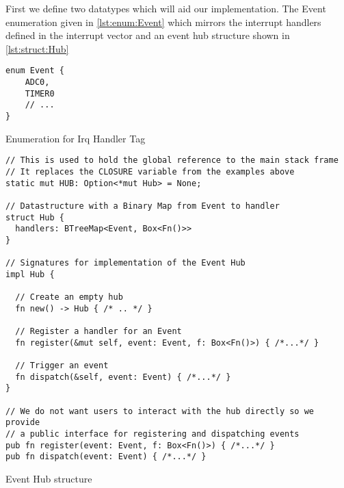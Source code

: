 First we define two datatypes which will aid our implementation.
The Event enumeration given in \autoref{lst:enum:Event} which mirrors the interrupt handlers defined in the interrupt vector and an event hub structure shown in \autoref{lst:struct:Hub}

\begin{listing}[H]
  \begin{verbatim}
enum Event {
    ADC0,
    TIMER0
    // ...
}
  \end{verbatim}
  \caption{Enumeration for Irq Handler Tag}
  \label{lst:enum:Event}
\end{listing}

\begin{listing}[H]
  \begin{verbatim}
// This is used to hold the global reference to the main stack frame
// It replaces the CLOSURE variable from the examples above
static mut HUB: Option<*mut Hub> = None;

// Datastructure with a Binary Map from Event to handler
struct Hub {
  handlers: BTreeMap<Event, Box<Fn()>>
}

// Signatures for implementation of the Event Hub
impl Hub {

  // Create an empty hub
  fn new() -> Hub { /* .. */ }

  // Register a handler for an Event
  fn register(&mut self, event: Event, f: Box<Fn()>) { /*...*/ }

  // Trigger an event
  fn dispatch(&self, event: Event) { /*...*/ }
}

// We do not want users to interact with the hub directly so we provide
// a public interface for registering and dispatching events
pub fn register(event: Event, f: Box<Fn()>) { /*...*/ }
pub fn dispatch(event: Event) { /*...*/ }
  \end{verbatim}
  \caption{Event Hub structure}
  \label{lst:struct:Hub}
\end{listing}

